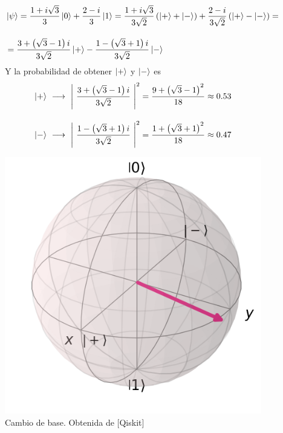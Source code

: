 \documentclass[12pt]{article}
\numberwithin{equation}{section} %
\begin{document}
    \begin{figure}[h!]
        \centering
        \begin{minipage}{0.65\textwidth}
            \begin{align*}
                &\ket{\psi} = \frac{1 + i \sqrt{3}}{3} \ket{0} + \frac{2 - i}{3} \ket{1} = \frac{1 + i \sqrt{3}}{3 \sqrt{2}} \left( \ket{+} + \ket{-} \right) + \frac{2 - i}{3 \sqrt{2}} \left( \ket{+} - \ket{-} \right) = \\[10pt]
                &= \frac{3 + \left( \sqrt{3} - 1 \right) i}{3 \sqrt{2}} \ket{+} - \frac{1 - \left( \sqrt{3} + 1 \right) i}{3 \sqrt{2}} \ket{-}
            \end{align*}
            Y la probabilidad de obtener \( \ket{+} \) y \( \ket{-} \) es 
            \begin{align*}
                \ket{+} \ &\longrightarrow \ \left| \ \frac{3 + \left( \sqrt{3} - 1 \right) i}{3 \sqrt{2}} \ \right| ^ {2} = \frac{9 + \left( \sqrt{3} - 1\right) ^ {2}}{18} \approx 0.53 \\[10pt]
                \ket{-} \ &\longrightarrow \ \left| \ \frac{1 - \left( \sqrt{3} + 1 \right) i}{3 \sqrt{2}} \ \right| ^ {2} = \frac{1 + \left( \sqrt{3} + 1\right) ^ {2}}{18} \approx 0.47
            \end{align*}
        \end{minipage}
        \hfill
        \begin{minipage}{0.3\textwidth}
            \includegraphics[width=\textwidth]{img/Bloch/bloch_change_basis_example.png}  
        \end{minipage}
        \caption{Cambio de base. Obtenida de [Qiskit]}\label{fig: bloch_ejemplo_medicion_2} 
    \end{figure}
\end{document}
